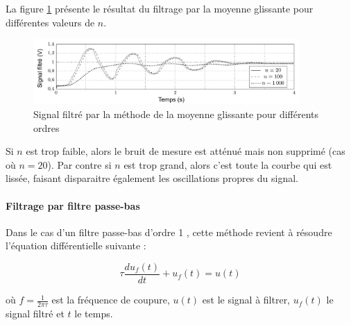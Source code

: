 %
La figure \ref{fig11} présente le résultat du filtrage par la moyenne glissante pour différentes valeurs de $n$.

%
\begin{figure}[!htb]
\begin{center}
\includegraphics[width=0.9\textwidth]{images/2023_10_30_d11e80da56f59e3b3cdfg-09}
\caption{Signal filtré par la méthode de la moyenne glissante pour différents ordres \label{fig11}}
\end{center}
\end{figure}

\fi
{}
\ifprof
\begin{texteCache}

Si \(n\) est trop faible, alors le bruit de mesure est atténué mais
  non supprimé (cas où \(n = 20\)). Par contre si \(n\) est trop grand,
  alors c'est toute la courbe qui est lissée, faisant disparaitre
  également les oscillations propres du signal.
  
  
    \vspace{2cm}
  \end{texteCache}
\else

\paragraph{Filtrage par filtre passe-bas}

Dans le cas d'un filtre passe-bas d'ordre 1 , cette méthode revient à résoudre l'équation différentielle suivante :

$$
\tau \frac{d u_{f}(t)}{d t}+u_{f}(t)=u(t)
$$

où $f=\frac{1}{2 \pi \tau}$ est la fréquence de coupure, $u(t)$ est le signal à filtrer, $u_{f}(t)$ le signal filtré et $t$ le temps.

\fi



